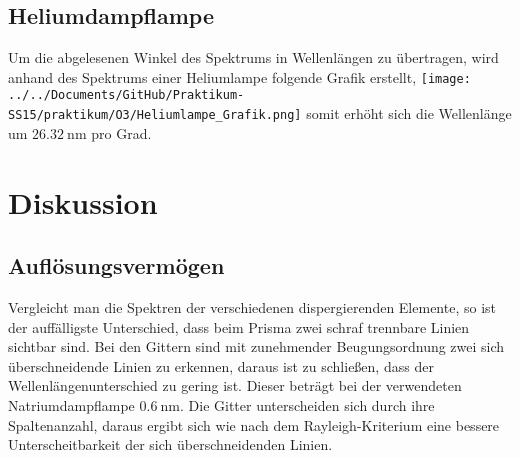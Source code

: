 \subsection{Heliumdampflampe}
Um die abgelesenen Winkel des Spektrums in Wellenlängen zu übertragen, wird anhand des Spektrums einer Heliumlampe folgende Grafik erstellt,
\texttt{[image: ../../Documents/GitHub/Praktikum-SS15/praktikum/O3/Heliumlampe\_Grafik.png]} 
somit erhöht sich die Wellenlänge um $ \SI{26,32}{\nano\meter} $ pro Grad.

\newpage
\section{Diskussion}
\subsection{Auflösungsvermögen}
Vergleicht man die Spektren der verschiedenen dispergierenden Elemente, so ist der auffälligste Unterschied, dass beim Prisma zwei schraf trennbare Linien sichtbar sind. Bei den Gittern sind mit zunehmender Beugungsordnung zwei sich überschneidende Linien zu erkennen, daraus ist zu schließen, dass der Wellenlängenunterschied zu gering ist.
Dieser beträgt bei der verwendeten Natriumdampflampe $ \SI{0,6}{\nano\meter} $. Die Gitter unterscheiden sich durch ihre Spaltenanzahl, daraus ergibt sich wie nach dem Rayleigh-Kriterium eine bessere Unterscheitbarkeit der sich überschneidenden Linien. 
